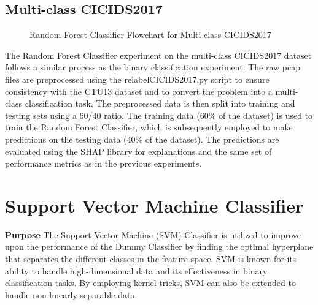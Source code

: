 \subsection{Multi-class CICIDS2017}
\begin{figure}[H]
\centering
{}
\caption{Random Forest Classifier Flowchart for Multi-class CICIDS2017}\label{fig:RandomForestFlowMultiCICIDS2017}
\end{figure}

The Random Forest Classifier experiment on the multi-class CICIDS2017 dataset follows a similar process as the binary classification experiment. The raw pcap files are preprocessed using the relabelCICIDS2017.py script to ensure consistency with the CTU13 dataset and to convert the problem into a multi-class classification task. The preprocessed data is then split into training and testing sets using a 60/40 ratio. The training data (60\% of the dataset) is used to train the Random Forest Classifier, which is subsequently employed to make predictions on the testing data (40\% of the dataset). The predictions are evaluated using the SHAP library for explanations and the same set of performance metrics as in the previous experiments.

\section{Support Vector Machine Classifier}\label{sec:SVMClassifier}
\textbf{Purpose} The Support Vector Machine (SVM) Classifier is utilized to improve upon the performance of the Dummy Classifier by finding the optimal hyperplane that separates the different classes in the feature space. SVM is known for its ability to handle high-dimensional data and its effectiveness in binary classification tasks. By employing kernel tricks, SVM can also be extended to handle non-linearly separable data.

